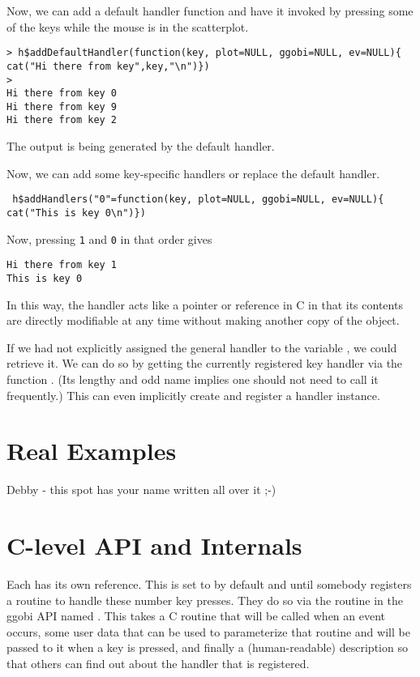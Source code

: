 \documentclass{article}
\def\Key#1{\texttt{#1}}
\begin{document}
Now, we can add a default handler function
and have it invoked by pressing some of the keys while
the mouse is in the scatterplot.
\begin{verbatim}
> h$addDefaultHandler(function(key, plot=NULL, ggobi=NULL, ev=NULL){ cat("Hi there from key",key,"\n")})
> 
Hi there from key 0 
Hi there from key 9 
Hi there from key 2 
\end{verbatim}
The output is being generated by the default handler.

Now, we can add some key-specific handlers or replace the 
default handler.
\begin{verbatim}
 h$addHandlers("0"=function(key, plot=NULL, ggobi=NULL, ev=NULL){ cat("This is key 0\n")})
\end{verbatim}
Now, pressing \Key{1} and \Key{0} in that order gives
\begin{verbatim}
Hi there from key 1 
This is key 0
\end{verbatim}

In this way, the handler acts like a pointer or reference in C in that
its contents are directly modifiable at any time without making
another copy of the object.

If we had not explicitly assigned the general handler to the variable
, we could retrieve it.  We can do so by getting the
currently registered key handler via the function
. (Its lengthy and odd name
implies one should not need to call it frequently.)  This can even
implicitly create and register a handler instance.


\section{Real Examples}

Debby - this spot has your name written all over it ;-)

\section{C-level API and Internals}

Each  has its own  reference.
This is set to \CNull{} by default and until somebody registers a
routine to handle these number key presses. They do so via the routine
in the ggobi API named
.  This takes a C
routine that will be called when an event occurs, some user data that
can be used to parameterize that routine and will be passed to it when
a key is pressed, and finally a (human-readable) description so that
others can find out about the handler that is registered.
\end{document}
